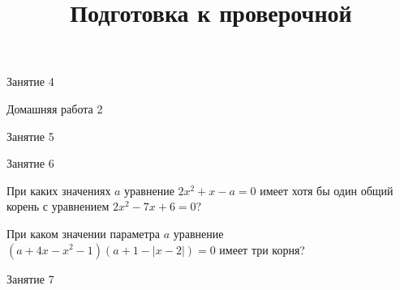 \begin{class}[number=4]
	\begin{listofex}
		\item Занятие 4
	\end{listofex}
\end{class}

\begin{homework}[number=2]
	\begin{listofex}
		\item Домашняя работа 2
	\end{listofex}
\end{homework}

\begin{class}[number=5]
	\begin{listofex}
		\item Занятие 5
	\end{listofex}
\end{class}

\begin{class}[number=6]
	\begin{listofex}
		\item Занятие 6
	\end{listofex}
\end{class}

\begin{homework}[number=3]
	\begin{listofex}
		\item При каких значениях \( a \) уравнение \( 2x^2+x-a=0 \) имеет хотя бы один общий корень с уравнением \( 2x^2-7x+6=0 \)?
		\item При каком значении параметра \( a \) уравнение \\ \( (a+4x-x^2-1)(a+1-|x-2|)=0 \) имеет три корня?
	\end{listofex}
\end{homework}

\begin{class}[number=7]
	\title{Подготовка к проверочной}
	\begin{listofex}
		\item Занятие 7
	\end{listofex}
\end{class}

